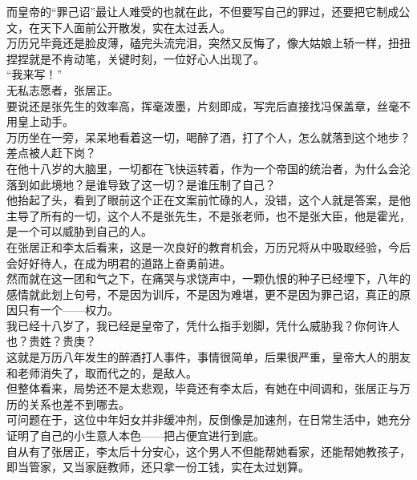 \begin{multicols}{\theparacolNo}
而皇帝的“罪己诏”最让人难受的也就在此，不但要写自己的罪过，还要把它制成公文，在天下人面前公开散发，实在太过丢人。\\

万历兄毕竟还是脸皮薄，磕完头流完泪，突然又反悔了，像大姑娘上轿一样，扭扭捏捏就是不肯动笔，关键时刻，一位好心人出现了。\\

“我来写！”\\

无私志愿者，张居正。\\

要说还是张先生的效率高，挥毫泼墨，片刻即成，写完后直接找冯保盖章，丝毫不用皇上动手。\\

万历坐在一旁，呆呆地看着这一切，喝醉了酒，打了个人，怎么就落到这个地步？差点被人赶下岗？\\

在他十八岁的大脑里，一切都在飞快运转着，作为一个帝国的统治者，为什么会沦落到如此境地？是谁导致了这一切？是谁压制了自己？\\

他抬起了头，看到了眼前这个正在文案前忙碌的人，没错，这个人就是答案，是他主导了所有的一切，这个人不是张先生，不是张老师，也不是张大臣，他是霍光，是一个可以威胁到自己的人。\\

在张居正和李太后看来，这是一次良好的教育机会，万历兄将从中吸取经验，今后会好好待人，在成为明君的道路上奋勇前进。\\

然而就在这一团和气之下，在痛哭与求饶声中，一颗仇恨的种子已经埋下，八年的感情就此划上句号，不是因为训斥，不是因为难堪，更不是因为罪己诏，真正的原因只有一个——权力。\\

我已经十八岁了，我已经是皇帝了，凭什么指手划脚，凭什么威胁我？你何许人也？贵姓？贵庚？\\

这就是万历八年发生的醉酒打人事件，事情很简单，后果很严重，皇帝大人的朋友和老师消失了，取而代之的，是敌人。\\

但整体看来，局势还不是太悲观，毕竟还有李太后，有她在中间调和，张居正与万历的关系也差不到哪去。\\

可问题在于，这位中年妇女并非缓冲剂，反倒像是加速剂，在日常生活中，她充分证明了自己的小生意人本色——把占便宜进行到底。\\

自从有了张居正，李太后十分安心，这个男人不但能帮她看家，还能帮她教孩子，即当管家，又当家庭教师，还只拿一份工钱，实在太过划算。\\


\end{multicols}
